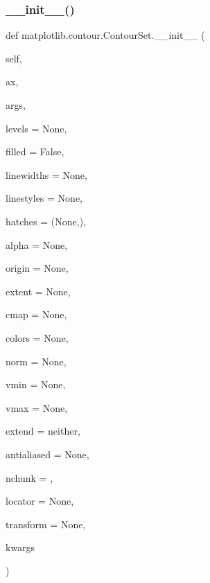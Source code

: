 \subsubsection{\texorpdfstring{\+\_\+\+\_\+init\+\_\+\+\_\+()}{\_\_init\_\_()}}
{\footnotesize\ttfamily def matplotlib.\+contour.\+Contour\+Set.\+\_\+\+\_\+init\+\_\+\+\_\+ (\begin{DoxyParamCaption}\item[{}]{self,  }\item[{}]{ax,  }\item[{}]{args,  }\item[{}]{levels = {\ttfamily None},  }\item[{}]{filled = {\ttfamily False},  }\item[{}]{linewidths = {\ttfamily None},  }\item[{}]{linestyles = {\ttfamily None},  }\item[{}]{hatches = {\ttfamily (None,)},  }\item[{}]{alpha = {\ttfamily None},  }\item[{}]{origin = {\ttfamily None},  }\item[{}]{extent = {\ttfamily None},  }\item[{}]{cmap = {\ttfamily None},  }\item[{}]{colors = {\ttfamily None},  }\item[{}]{norm = {\ttfamily None},  }\item[{}]{vmin = {\ttfamily None},  }\item[{}]{vmax = {\ttfamily None},  }\item[{}]{extend = {\ttfamily \textquotesingle{}neither\textquotesingle{}},  }\item[{}]{antialiased = {\ttfamily None},  }\item[{}]{nchunk = {},  }\item[{}]{locator = {\ttfamily None},  }\item[{}]{transform = {\ttfamily None},  }\item[{}]{kwargs }\end{DoxyParamCaption})}

